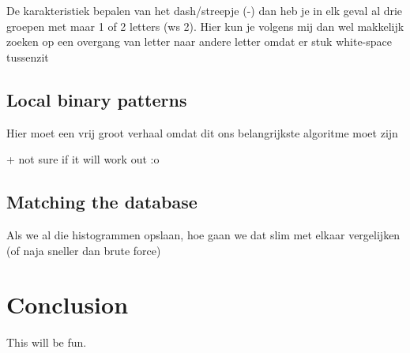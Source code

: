 \documentclass[a4paper]{article}
\begin{document}
De karakteristiek bepalen van het dash/streepje (-) dan heb je in elk geval al
drie groepen met maar 1 of 2 letters (ws 2). Hier kun je volgens mij dan wel 
makkelijk zoeken op een overgang van letter naar andere letter omdat er stuk
white-space tussenzit

\subsection{Local binary patterns}

Hier moet een vrij groot verhaal omdat dit ons belangrijkste algoritme moet zijn

+ not sure if it will work out :o

\subsection{Matching the database}

Als we al die histogrammen opslaan, hoe gaan we dat slim met elkaar vergelijken
(of naja sneller dan brute force)


\section{Conclusion}

This will be fun.
\end{document}
